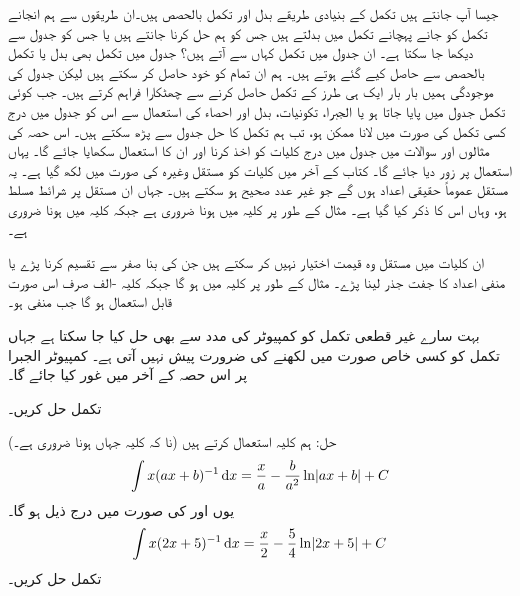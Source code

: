 جیسا آپ جانتے ہیں تکمل کے بنیادی طریقے بدل اور تکمل بالحصص ہیں۔ان طریقوں سے  ہم انجانے تکمل کو جانے پہچانے تکمل میں بدلتے ہیں جس کو ہم حل کرنا جانتے ہیں یا جس کو جدول سے دیکھا جا سکتا ہے۔ ان جدول میں تکمل کہاں سے آتے ہیں؟ جدول میں تکمل بھی بدل یا تکمل بالحصص سے حاصل کیے گئے ہوتے ہیں۔ ہم ان تمام کو خود حاصل کر سکتے ہیں لیکن جدول کی موجودگی ہمیں بار بار ایک ہی طرز کے تکمل حاصل کرنے سے چھٹکارا فراہم کرتے ہیں۔ جب کوئی تکمل جدول میں پایا جاتا ہو یا الجبرا، تکونیات، بدل اور احصاء کی استعمال سے اس کو جدول میں درج کسی تکمل کی صورت میں لانا ممکن ہو، تب ہم تکمل کا حل جدول سے پڑھ سکتے ہیں۔ اس حصہ کی مثالوں اور سوالات میں جدول میں درج کلیات کو اخذ کرنا اور ان کا استعمال سکھایا جائے گا۔ یہاں استعمال پر زور دیا جائے گا۔ کتاب کے آخر میں کلیات کو مستقل   وغیرہ کی صورت میں لکھ گیا ہے۔ یہ مستقل عموماً حقیقی اعداد ہوں گے جو غیر عدد صحیح ہو سکتے ہیں۔ جہاں ان مستقل پر شرائط مسلط ہو، وہاں اس کا ذکر کیا گیا ہے۔ مثال کے طور پر کلیہ  میں  ہونا ضروری ہے جبکہ کلیہ  میں  ہونا ضروری ہے۔ 

ان کلیات میں  مستقل وہ قیمت اختیار نہیں کر سکتے ہیں جن کی بنا صفر سے تقسیم کرنا پڑے یا منفی اعداد کا جفت جذر لینا پڑے۔ مثال کے طور پر کلیہ  میں  ہو گا جبکہ کلیہ -الف صرف اس صورت قابل استعمال ہو گا جب  منفی ہو۔ 

بہت سارے غیر قطعی تکمل کو کمپیوٹر کی مدد سے بھی حل کیا جا سکتا ہے جہاں تکمل کو کسی خاص صورت میں لکھنے کی ضرورت پیش نہیں آتی ہے۔ کمپیوٹر الجبرا پر اس حصہ کے آخر میں غور کیا جائے گا۔

تکمل  حل کریں۔

حل:\quad
ہم کلیہ  استعمال کرتے ہیں (نا کہ کلیہ  جہاں  ہونا ضروری ہے۔)
\begin{align*}
\int x(ax+b)^{-1}\dif x=\frac{x}{a}-\frac{b}{a^2}\ln\abs{ax+b}+C
\end{align*}
یوں  اور  کی صورت میں درج ذیل ہو گا۔
\begin{align*}
\int x(2x+5)^{-1}\dif x=\frac{x}{2}-\frac{5}{4}\ln\abs{2x+5}+C
\end{align*}
تکمل  حل کریں۔

